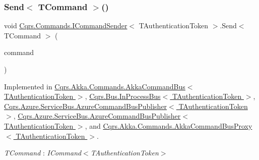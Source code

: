 \subsubsection{\texorpdfstring{Send$<$ T\+Command $>$()}{Send< TCommand >()}\hspace{0.1cm}{\footnotesize\ttfamily [1/2]}}
{\footnotesize\ttfamily void \hyperlink{interfaceCqrs_1_1Commands_1_1ICommandSender}{Cqrs.\+Commands.\+I\+Command\+Sender}$<$ T\+Authentication\+Token $>$.Send$<$ T\+Command $>$ (\begin{DoxyParamCaption}\item[{T\+Command}]{command }\end{DoxyParamCaption})}



Implemented in \hyperlink{classCqrs_1_1Akka_1_1Commands_1_1AkkaCommandBus_a696f471533265685f80922e39727288e}{Cqrs.\+Akka.\+Commands.\+Akka\+Command\+Bus$<$ T\+Authentication\+Token $>$}, \hyperlink{classCqrs_1_1Bus_1_1InProcessBus_a6a074ef3663d2855875307b106fe4416}{Cqrs.\+Bus.\+In\+Process\+Bus$<$ T\+Authentication\+Token $>$}, \hyperlink{classCqrs_1_1Azure_1_1ServiceBus_1_1AzureCommandBusPublisher_ad4bbbadcac7eb6a83e47649979bc2e7f}{Cqrs.\+Azure.\+Service\+Bus.\+Azure\+Command\+Bus\+Publisher$<$ T\+Authentication\+Token $>$}, \hyperlink{classCqrs_1_1Azure_1_1ServiceBus_1_1AzureCommandBusPublisher_ad4bbbadcac7eb6a83e47649979bc2e7f}{Cqrs.\+Azure.\+Service\+Bus.\+Azure\+Command\+Bus\+Publisher$<$ T\+Authentication\+Token $>$}, and \hyperlink{classCqrs_1_1Akka_1_1Commands_1_1AkkaCommandBusProxy_a15945f41b7439e722f5608f48b63c6d9}{Cqrs.\+Akka.\+Commands.\+Akka\+Command\+Bus\+Proxy$<$ T\+Authentication\+Token $>$}.

\begin{Desc}
\item[Type Constraints]\begin{description}
\item[{\em T\+Command} : {\em I\+Command$<$T\+Authentication\+Token$>$}]\end{description}
\end{Desc}
\mbox{\label{interfaceCqrs_1_1Commands_1_1ICommandSender_a3fb3ec40a3e862f721a7c9204e67e832}} 
